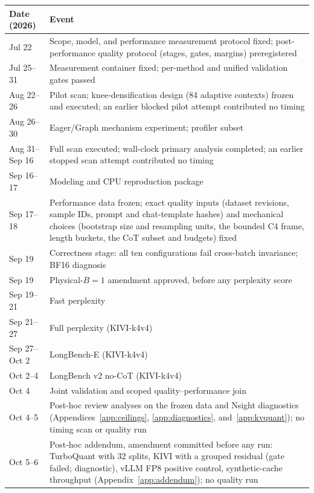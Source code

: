 \begin{center}
\footnotesize
\begin{tabular}{@{}L{1.75cm}L{5.85cm}@{}}
\toprule
Date (2026) & Event \\
\midrule
Jul 22 & Scope, model, and performance measurement protocol fixed; post-performance quality protocol (stages, gates, margins) preregistered \\
Jul 25--31 & Measurement container fixed; per-method and unified validation gates passed \\
Aug 22--26 & Pilot scan; knee-densification design (84 adaptive contexts) frozen and executed; an earlier blocked pilot attempt contributed no timing \\
Aug 26--30 & Eager/Graph mechanism experiment; profiler subset \\
Aug 31--Sep 16 & Full scan executed; wall-clock primary analysis completed; an earlier stopped scan attempt contributed no timing \\
Sep 16--17 & Modeling and CPU reproduction package \\
Sep 17--18 & Performance data frozen; exact quality inputs (dataset revisions, sample IDs, prompt and chat-template hashes) and mechanical choices (bootstrap size and resampling units, the bounded C4 frame, length buckets, the CoT subset and budgets) fixed \\
Sep 19 & Correctness stage: all ten configurations fail cross-batch invariance; BF16 diagnosis \\
Sep 19 & Physical-$B = 1$ amendment approved, before any perplexity score \\
Sep 19--21 & Fast perplexity \\
Sep 21--27 & Full perplexity (KIVI-k4v4) \\
Sep 27--Oct 2 & LongBench-E (KIVI-k4v4) \\
Oct 2--4 & LongBench v2 no-CoT (KIVI-k4v4) \\
Oct 4 & Joint validation and scoped quality--performance join \\
Oct 4--5 & Post-hoc review analyses on the frozen data and Nsight diagnostics (Appendices~\ref{app:ceilings}, \ref{app:diagnostics}, and~\ref{app:kvquant}); no timing scan or quality run \\
Oct 5--6 & Post-hoc addendum, amendment committed before any run: TurboQuant with 32 splits, KIVI with a grouped residual (gate failed; diagnostic), vLLM FP8 positive control, synthetic-cache throughput (Appendix~\ref{app:addendum}); no quality run \\
\bottomrule
\end{tabular}
\end{center}

